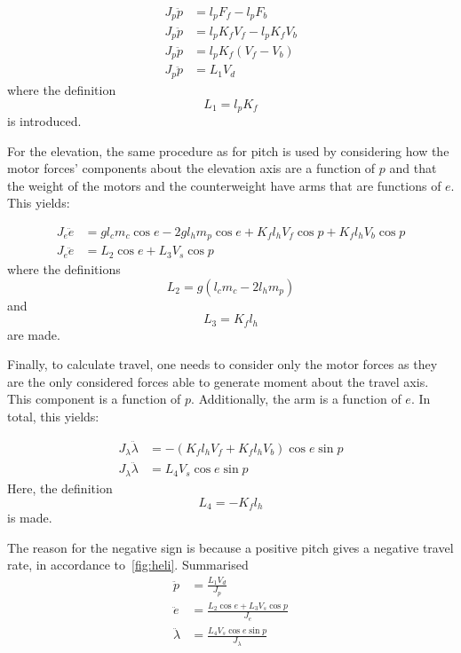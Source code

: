 \begin{align}\label{eq:P1_pitch_non-linear}
    J_p \ddot{p} &= l_p F_f - l_p F_b \nonumber \\
    J_p \ddot{p} &= l_p K_f V_f - l_p K_f V_b \nonumber \\
    J_p \ddot{p} &= l_p K_f (V_f - V_b) \nonumber \\
    J_p \ddot{p} &= L_1 V_d
\end{align}
where the definition
\begin{equation}\label{eq:P1_L_1}
    L_1 = l_p K_f
\end{equation}
is introduced.

For the elevation, the same procedure as for pitch is used by considering how the motor forces' components about the elevation axis are a function of $p$ and that the weight of the motors and the counterweight have arms that are functions of $e$. This yields:

\begin{align}\label{eq:P1_elevation_non-linear}
    J_e \ddot{e} &= g l_c m_c \cos{e} - 2 g l_h m_p \cos{e} + K_f l_h V_f \cos{p} + K_f l_h V_b \cos{p} \nonumber \\
    J_e \ddot{e} &= L_2 \cos{e} + L_3 V_s \cos{p}
\end{align}
where the definitions
\begin{equation}\label{eq:P1_L_2}
    L_2 = g (l_c m_c - 2 l_h m_p)
\end{equation}
and
\begin{equation}
    L_3 = K_f l_h
\end{equation}
are made.

Finally, to calculate travel, one needs to consider only the motor forces as they are the only considered forces able to generate moment about the travel axis. This component is a function of $p$. Additionally, the arm is a function of $e$. In total, this yields:

\begin{align}\label{eq:P1_travel_non-linear}
    J_\lambda \ddot{\lambda} &= -(K_f l_h V_f + K_f l_h V_b)\cos{e}\sin{p} \nonumber \\
    J_\lambda \ddot{\lambda} &= L_4 V_s \cos{e} \sin{p}
\end{align}
Here, the definition
\begin{equation}\label{eq:P1_L_4}
    L_4 = - K_f l_h
\end{equation}
is made.

The reason for the negative sign is because a positive pitch gives a negative travel rate, in accordance to~\cref{fig:heli}. 
Summarised
\begin{subequations}\label{eq:P1_equation_of_motion}
    \begin{align}
        \ddot{p} &= \frac{L_1 V_d}{J_p} 
        \label{eq:P1_p_motion} \\
        \ddot{e} &= \frac{L_2 \cos{e} + L_3 V_s \cos{p}}{J_e} 
        \label{eq:P1_e_motion} \\
        \ddot{\lambda} &= \frac{L_4 V_s \cos{e} \sin{p}}{J_\lambda}
        \label{eq:P1_lambda_motion}
    \end{align}
\end{subequations}